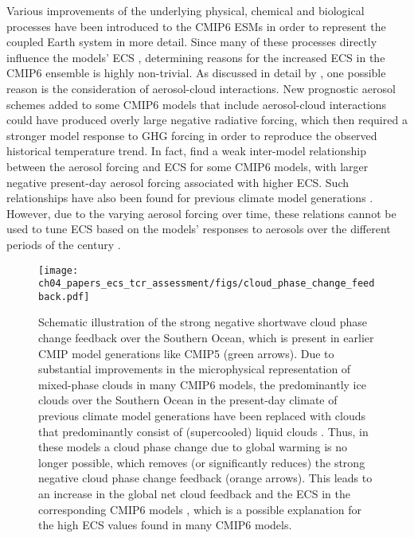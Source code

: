 Various improvements of the underlying physical, chemical and biological
processes have been introduced to the \acs{CMIP}6 \acp{ESM} in order to
represent the coupled Earth system in more detail. Since many of these
processes directly influence the models' \ac{ECS} \autocite{Forster2020},
determining reasons for the increased \ac{ECS} in the \acs{CMIP}6 ensemble is
highly non-trivial. As discussed in detail by \textcite{Meehl2020}, one
possible reason is the consideration of aerosol-cloud interactions. New
prognostic aerosol schemes added to some \acs{CMIP}6 models that include
aerosol-cloud interactions could have produced overly large negative radiative
forcing, which then required a stronger model response to \ac{GHG} forcing in
order to reproduce the observed historical temperature trend. In fact,
\textcite{Meehl2020} find a weak inter-model relationship between the aerosol
forcing and \ac{ECS} for some \acs{CMIP}6 models, with larger negative
present-day aerosol forcing associated with higher \ac{ECS}. Such relationships
have also been found for previous climate model generations
\autocite{Kiehl2007, Forster2013}. However, due to the varying aerosol forcing
over time, these relations cannot be used to tune \ac{ECS} based on the models'
responses to aerosols over the different periods of the  century
\autocite{Dittus2020}.

\begin{figure}[t]
  \centering
  \texttt{[image: 
    ch04\_papers\_ecs\_tcr\_assessment/figs/cloud\_phase\_change\_feedback.pdf]}
  \caption{Schematic illustration of the strong negative shortwave cloud phase
    change feedback over the Southern Ocean, which is present in earlier
    \acs{CMIP} model generations like \acs{CMIP}5 (green arrows). Due to
    substantial improvements in the microphysical representation of mixed-phase
    clouds in many \acs{CMIP}6 models, the predominantly ice clouds over the
    Southern Ocean in the present-day climate of previous climate model
    generations have been replaced with clouds that predominantly consist of
    (supercooled) liquid clouds \autocite{BodasSalcedo2019, Gettelman2019,
      Mulcahy2020, Williams2020}. Thus, in these models a cloud phase change
    due to global warming is no longer possible, which removes (or
    significantly reduces) the strong negative cloud phase change feedback
    (orange arrows). This leads to an increase in the global net cloud
    feedback \autocite{BodasSalcedo2019, Tan2016} and the \acf{ECS} in the
    corresponding \acs{CMIP}6 models \autocite{Andrews2019, Gettelman2019},
    which is a possible explanation for the high \acs{ECS} values found in
    many \acs{CMIP}6 models.}
  \label{fig:04:cloud_phase_change_feedback}
\end{figure}

